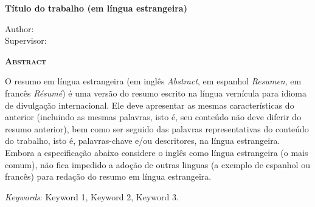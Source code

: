 \begin{center}
	{\Large{\textbf{Título do trabalho (em língua estrangeira)}}}
\end{center}

\vspace{1cm}

\begin{flushright}
	Author: \writeauthor\\
	Supervisor: \writeteacheren
\end{flushright}

\vspace{1cm}

\begin{center}
	\Large{\textsc{\textbf{Abstract}}}
\end{center}

\noindent O resumo em língua estrangeira (em inglês \textit{Abstract}, em
espanhol \textit{Resumen}, em francês \textit{Résumé}) é uma versão do resumo
escrito na língua vernícula para idioma de divulgação internacional. Ele deve
apresentar as mesmas características do anterior (incluindo as mesmas palavras,
isto é, seu conteúdo não deve diferir do resumo anterior), bem como ser seguido
das palavras representativas do conteúdo do trabalho, isto é, palavras-chave
e/ou descritores, na língua estrangeira. Embora a especificação abaixo considere
o inglês como língua estrangeira (o mais comum), não fica impedido a adoção de
outras linguas (a exemplo de espanhol ou francês) para redação do resumo em
língua estrangeira.

\noindent\textit{Keywords}: Keyword 1, Keyword 2, Keyword 3.